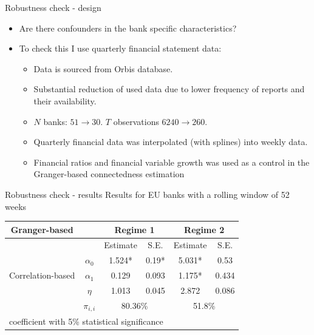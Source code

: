 \documentclass{beamer}
\begin{document}
\begin{frame}{Robustness check - design}
  
    \begin{itemize}
      \item<1-> Are there confounders in the bank specific characteristics?
      \item<2-> To check this I use quarterly financial statement data:
      \begin{itemize}
        \item<3-> Data is sourced from Orbis database.
        \item<4-> Substantial reduction of used data due to lower frequency of reports and their availability.
        \item<5-> $N$ banks: $51 \rightarrow 30$. $T$ observations $6240 \rightarrow 260$.
        \item<6-> Quarterly financial data was interpolated (with splines) into weekly data.
        \item<7-> Financial ratios and financial variable growth was used as a control in the Granger-based connectedness estimation
      \end{itemize}
\end{itemize}

\end{frame}

\begin{frame}{Robustness check - results}
  Results for EU banks with a rolling window of 52 weeks
  \begin{table}\small
    \begin{tabular}{cccccc}
      \toprule
       Granger-based &  & \multicolumn{2}{c}{\bfseries Regime 1} & \multicolumn{2}{c}{\bfseries Regime 2}  \\
       \hline
       & & Estimate & S.E. & Estimate & S.E. \\
       \hline
       \multirow{3}{*}[\normalbaselineskip]{Correlation-based} & $\alpha_0$ & 1.524* & 0.19* & 5.031*  & 0.53 \\
        & $\alpha_1$ & 0.129 & 0.093 & 1.175* & 0.434 \\
        & $\eta$ & 1.013 & 0.045 & 2.872 & 0.086 \\
        & $\pi_{i,i}$ &  \multicolumn{2}{c}{80.36\%} & \multicolumn{2}{c}{51.8\%}\\
        \hline
      \multicolumn{6}{l}{\footnotesize * coefficient with 5\% statistical significance} \\
      \hline
    \end{tabular}
  \end{table}
\end{frame}  
\end{document}
